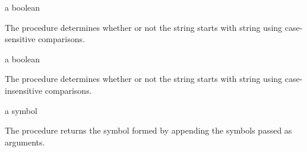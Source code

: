 \begin{procedure}
\end{procedure}
\returns{} a boolean

The  procedure determines whether or not the string
 starts with string  using case-sensitive comparisons.

\begin{procedure}
\end{procedure}
\returns{} a boolean

The  procedure determines whether or not the
string  starts with string  using case-insensitive
comparisons.

\begin{procedure}
\end{procedure}
\returns{} a symbol

The  procedure returns the symbol formed by
appending the symbols passed as arguments.
